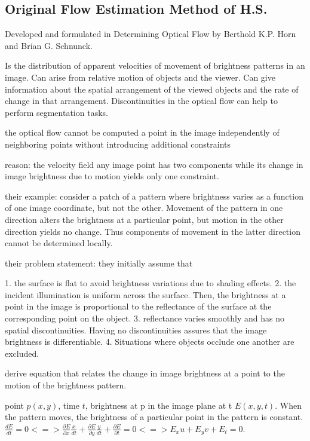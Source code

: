 \subsection{Original Flow Estimation Method of H.S.}
\label{sec:hs_formulation}
Developed and formulated in Determining Optical Flow by Berthold K.P. Horn and Brian G. Schnunck.

Is the distribution of apparent velocities of movement of brightness patterns in an image.
Can arise from relative motion of objects and the viewer.
Can give information about the spatial arrangement of the viewed objects and the rate of change in that arrangement.
Discontinuities in the optical flow can help to perform segmentation tasks.

the optical flow cannot be computed a point in the image independently of neighboring points without introducing additional constraints

reason: the velocity field any image point has two components while its change in image brightness due to motion yields only one constraint.

their example: consider a patch of a pattern where brightness varies as a function of one image coordinate, but not the other. Movement of the pattern in one direction alters the brightness at a particular point, but motion in the other direction yields no change. Thus components of movement in the latter direction cannot be determined locally.

their problem statement:
they initially assume that 

1. the surface is flat to avoid brightness variations due to shading effects.
2. the incident illumination is uniform across the surface. Then, the brightness at a point in the image is proportional to the reflectance of the surface at the corresponding point on the object.
3. reflectance varies smoothly and has no spatial discontinuities. Having no discontinuities assures that the image brightness is differentiable.
4. Situations where objects occlude one another are excluded.

derive equation that relates the change in image brightness at a point to the motion of the brightness pattern.

point $p(x,y)$, time $t$, brightness at p in the image plane at t $E(x,y,t)$.
When the pattern moves, the brightness of a particular point in the pattern is constant. 
$\frac{d E}{dt} = 0 <=> \frac{\partial E}{\partial x} \frac{x}{dt} + \frac{\partial E}{\partial y} \frac{y}{dt} + \frac{\partial E}{\partial t} = 0 <=> E_{x} u + E_{y} v + E_{t} = 0$.

